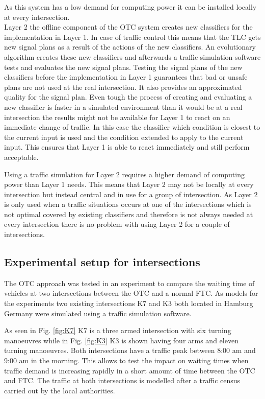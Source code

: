 As this system has a low demand for computing power it can be installed locally at every intersection.\cite{organicLCS}\ \\

Layer 2 the offline component of the OTC system creates new classifiers for the implementation in Layer 1. In case of traffic control this means that the TLC gets new signal plans as a result of the actions of the new classifiers. An evolutionary algorithm creates these new classifiers and afterwards a traffic simulation software tests and evaluates the new signal plans. 
Testing the signal plans of the new classifiers before the implementation in Layer 1 guarantees that bad or unsafe plans are not used at the real intersection. It also provides an approximated quality for the signal plan. Even tough the process of creating and evaluating a new classifier is faster in a simulated environment than it would be at a real intersection the results might not be available for Layer 1 to react on an immediate change of traffic. In this case the classifier which condition is closest to the current input is used and the condition extended to apply to the current input. This ensures that Layer 1 is able to react immediately and still perform acceptable.\cite{organic1}\cite{organicLCS}

Using a traffic simulation for Layer 2 requires a higher demand of computing power than Layer 1
needs. This means that Layer 2 may not be locally at every intersection but instead central and in use for a group of intersection. As Layer 2 is only used when a traffic situations occurs at one of the intersections which is not optimal covered by existing classifiers and therefore is not always needed at every intersection there is no problem with using Layer 2 for a couple of intersections.\cite{organicLCS}

\subsection{Experimental setup for intersections}
The OTC approach was tested in an experiment to compare the waiting time of vehicles at two intersections between the OTC and a normal FTC. As models for the experiments two existing intersections K7 and K3 both located in Hamburg Germany were simulated using a traffic
simulation software.

As seen in Fig. \ref{fig:K7} K7 is a three armed intersection with six turning manoeuvres  while in Fig. \ref{fig:K3} K3 is shown having four arms and eleven turning manoeuvres. Both intersections have a traffic peak between 8:00 am and 9:00 am in the morning. This allows to test the impact on waiting times when traffic demand is increasing rapidly in a short amount of time between the OTC and FTC. The traffic at both intersections is modelled after a traffic census carried out by the local authorities.\cite{organic1}

